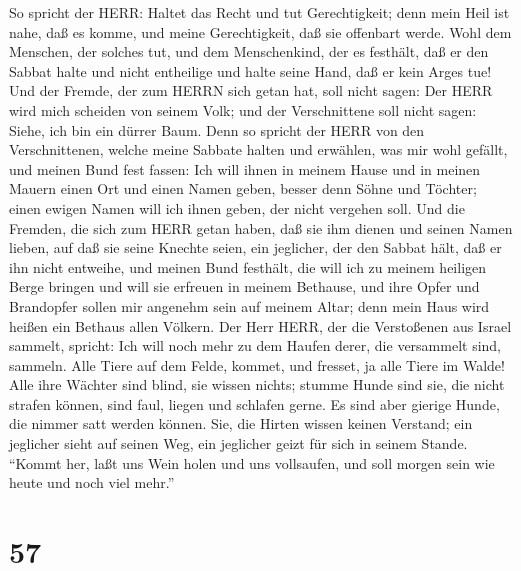  So spricht der HERR: Haltet das Recht und tut
Gerechtigkeit; denn mein Heil ist nahe, daß es komme, und meine
Gerechtigkeit, daß sie offenbart werde.  Wohl dem Menschen,
der solches tut, und dem Menschenkind, der es festhält, daß er den
Sabbat halte und nicht entheilige und halte seine Hand, daß er kein
Arges tue!  Und der Fremde, der zum HERRN sich getan hat,
soll nicht sagen: Der HERR wird mich scheiden von seinem Volk; und der
Verschnittene soll nicht sagen: Siehe, ich bin ein dürrer Baum.
 Denn so spricht der HERR von den Verschnittenen, welche
meine Sabbate halten und erwählen, was mir wohl gefällt, und meinen Bund
fest fassen:  Ich will ihnen in meinem Hause und in meinen
Mauern einen Ort und einen Namen geben, besser denn Söhne und Töchter;
einen ewigen Namen will ich ihnen geben, der nicht vergehen soll.
 Und die Fremden, die sich zum HERR getan haben, daß sie ihm
dienen und seinen Namen lieben, auf daß sie seine Knechte seien, ein
jeglicher, der den Sabbat hält, daß er ihn nicht entweihe, und meinen
Bund festhält,  die will ich zu meinem heiligen Berge
bringen und will sie erfreuen in meinem Bethause, und ihre Opfer und
Brandopfer sollen mir angenehm sein auf meinem Altar; denn mein Haus
wird heißen ein Bethaus allen Völkern.  Der Herr HERR, der
die Verstoßenen aus Israel sammelt, spricht: Ich will noch mehr zu dem
Haufen derer, die versammelt sind, sammeln.  Alle Tiere auf
dem Felde, kommet, und fresset, ja alle Tiere im Walde! 
Alle ihre Wächter sind blind, sie wissen nichts; stumme Hunde sind sie,
die nicht strafen können, sind faul, liegen und schlafen gerne.
 Es sind aber gierige Hunde, die nimmer satt werden können.
Sie, die Hirten wissen keinen Verstand; ein jeglicher sieht auf seinen
Weg, ein jeglicher geizt für sich in seinem Stande. 
``Kommt her, laßt uns Wein holen und uns vollsaufen, und soll morgen
sein wie heute und noch viel mehr.''

\hypertarget{section-56}{%
\section{57}\label{section-56}}

